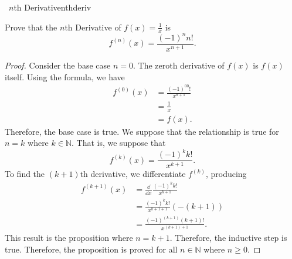         \begin{exercise}{\Difficulty\,\Difficulty\,\,\(n\)th Derivative}{nthderiv}
        
            Prove that the \(n\)th Derivative of \(f(x)=\frac{1}{x}\) is
            \begin{equation*}
                f^{(n)}(x)=\frac{(-1)^nn!}{x^{n+1}}.
            \end{equation*}
            \begin{proof}
                Consider the base case \(n=0\). The zeroth derivative of \(f(x)\) is \(f(x)\) itself. Using the formula, we have
                \begin{align*}
                    f^{(0)}(x)&=\frac{(-1)^00!}{x^{0+1}} \\
                    &=\frac{1}{x} \\
                    &=f(x).
                \end{align*}
                Therefore, the base case is true. We suppose that the relationship is true for \(n=k\) where \(k\in\mathbb{N}\). That is, we suppose that
                \begin{equation*}
                    f^{(k)}(x)=\frac{(-1)^kk!}{x^{k+1}}.
                \end{equation*}
                To find the \((k+1)\)th derivative, we differentiate \(f^{(k)}\), producing
                \begin{align*}
                    f^{(k+1)}(x)&=\frac{\dd}{\dd x}\frac{(-1)^kk!}{x^{k+1}} \\
                    &=\frac{(-1)^kk!}{x^{k+1+1}}(-(k+1)) \\
                    &=\frac{(-1)^{(k+1)}(k+1)!}{x^{(k+1)+1}}.
                \end{align*}
                This result is the proposition where \(n=k+1\). Therefore, the inductive step is true. Therefore, the proposition is proved for all \(n\in\mathbb{N}\) where \(n\geq0\).
            \end{proof}
        
        \end{exercise}
        \pagebreak
